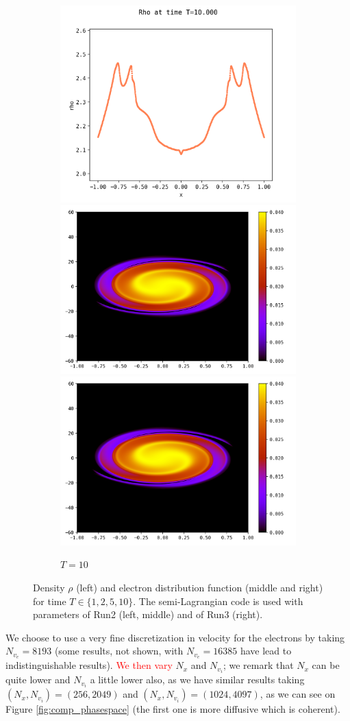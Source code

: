 \documentclass{article}
\numberwithin{equation}{section}
\newcommand{\mysubcaption}[1]{
	\vspace*{5pt}
	\begin{minipage}{0.8\linewidth}
		\begin{center}
			\footnotesize\emph{#1}
		\end{center}
	\end{minipage}
}
\newcommand{\imh}{\textheight} %
\begin{document}
\begin{figure}
	\begin{subfigure}{\textwidth}
		\centering
		\includegraphics[height=\imh,width=0.3\linewidth]{images/rhoT10.png}
		\includegraphics[height=\imh,width=0.3\linewidth]{images/feT10.png}
		\includegraphics[height=\imh,width=0.3\linewidth]{images/feT10_run_job2.png}
		\caption{$T=10$}
	\end{subfigure}


	\caption{Density $\rho$ (left) and electron distribution function (middle and right) for time $T\in \{1,2,5,10\}$. 
	 The semi-Lagrangian code is used with parameters of Run2 (left, middle) and of Run3 (right).
	}
	\label{fig:comp_temps}
\end{figure}  


We choose to use a very fine discretization in velocity for the electrons by taking $N_{v_e}=8193$ (some results, not shown, with $N_{v_e}=16385$ have lead to indistinguishable results).
\textcolor{red}{We then vary} $N_x$ and $N_{v_i}$; we remark that $N_x$ can be quite lower and $N_{v_i}$ a little lower also, as we have similar results taking $(N_x,N_{v_i})=(256,2049)$ and 
$(N_x,N_{v_i})=(1024,4097)$, as we can see on Figure \ref{fig:comp_phasespace} (the first one is more diffusive which is coherent). 
\end{document}
